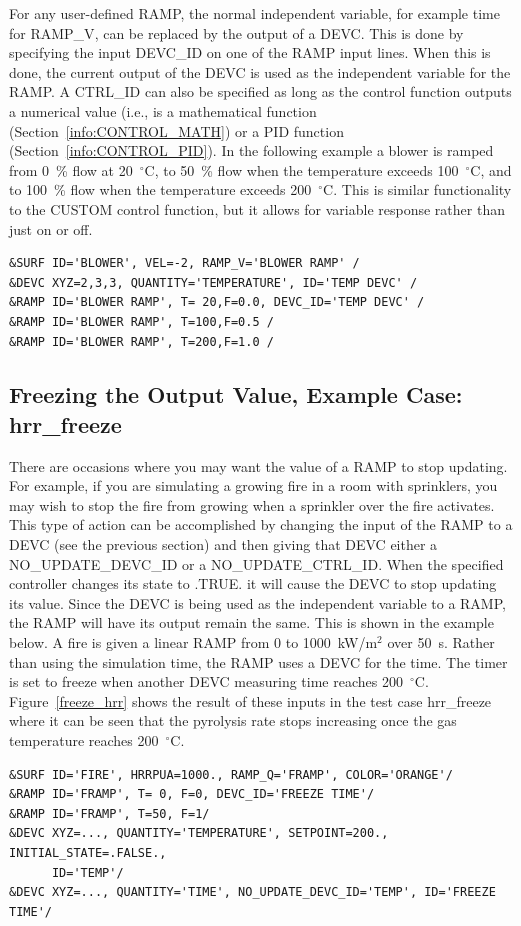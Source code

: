 \documentclass[11pt]{book}
\begin{document}
For any user-defined {\ct RAMP}, the normal independent variable, for example time for {\ct RAMP\_V}, can be replaced by the output of a {\ct DEVC}.
This is done by specifying the input {\ct DEVC\_ID} on one of the {\ct RAMP} input lines.  When this is done, the current output of the {\ct DEVC} is used as the independent variable for the {\ct RAMP}.  A {\ct CTRL\_ID} can also be specified as long as the control function outputs a numerical value (i.e., is a mathematical function (Section~\ref{info:CONTROL_MATH}) or a PID function (Section~\ref{info:CONTROL_PID}).
In the following example a blower is ramped from 0~\% flow at 20~$^\circ$C, to 50~\% flow when the temperature exceeds 100~$^\circ$C, and to 100~\% flow when the temperature exceeds 200~$^\circ$C.
This is similar functionality to the {\ct CUSTOM} control function, but it allows for variable response rather than just on or off.

\begin{lstlisting}
&SURF ID='BLOWER', VEL=-2, RAMP_V='BLOWER RAMP' /
&DEVC XYZ=2,3,3, QUANTITY='TEMPERATURE', ID='TEMP DEVC' /
&RAMP ID='BLOWER RAMP', T= 20,F=0.0, DEVC_ID='TEMP DEVC' /
&RAMP ID='BLOWER RAMP', T=100,F=0.5 /
&RAMP ID='BLOWER RAMP', T=200,F=1.0 /
\end{lstlisting}

\subsection{Freezing the Output Value, Example Case: hrr\_freeze}
\label{info:freeze_device}

There are occasions where you may want the value of a {\ct RAMP} to stop updating.  For example, if you are simulating a growing fire in a room with sprinklers, you may wish to stop the fire from growing when a sprinkler over the fire activates.  This type of action can be accomplished by changing the input of the {\ct RAMP} to a {\ct DEVC} (see the previous section) and then giving that {\ct DEVC} either a {\ct NO\_UPDATE\_DEVC\_ID} or a {\ct NO\_UPDATE\_CTRL\_ID}.  When the specified controller changes its state to {\ct .TRUE.} it will cause the {\ct DEVC} to stop updating its value.  Since the {\ct DEVC} is being used as the independent variable to a {\ct RAMP}, the {\ct RAMP} will have its output remain the same.  This is shown in the example below.  A fire is given a linear {\ct RAMP} from 0 to 1000~kW/m$^2$ over 50~s. Rather than using the simulation time, the {\ct RAMP} uses a {\ct DEVC} for the time.  The timer is set to freeze when another {\ct DEVC} measuring time reaches 200~$^\circ$C.  Figure~\ref{freeze_hrr} shows the result of these inputs in the test case {\ct hrr\_freeze} where it can be seen that the pyrolysis rate stops increasing once the gas temperature reaches 200~$^\circ$C.
\begin{lstlisting}
&SURF ID='FIRE', HRRPUA=1000., RAMP_Q='FRAMP', COLOR='ORANGE'/
&RAMP ID='FRAMP', T= 0, F=0, DEVC_ID='FREEZE TIME'/
&RAMP ID='FRAMP', T=50, F=1/
&DEVC XYZ=..., QUANTITY='TEMPERATURE', SETPOINT=200., INITIAL_STATE=.FALSE.,
      ID='TEMP'/
&DEVC XYZ=..., QUANTITY='TIME', NO_UPDATE_DEVC_ID='TEMP', ID='FREEZE TIME'/
\end{lstlisting}
\end{document}
